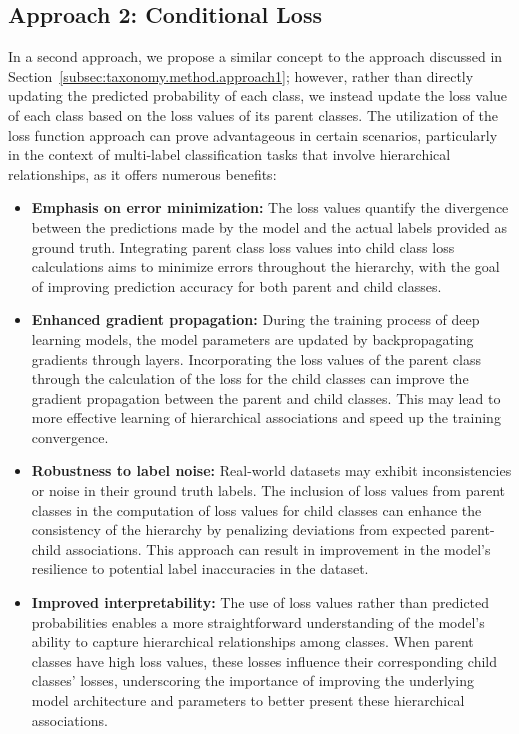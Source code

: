 \documentclass[final,1p,times,authoryear]{elsarticle}
\begin{document}
\subsection{Approach 2: Conditional Loss}\label{subsec:taxonomy.method.approach2}
In a second approach, we propose a similar concept to the approach discussed in Section~\ref{subsec:taxonomy.method.approach1}; however, rather than directly updating the predicted probability of each class, we instead update the loss value of each class based on the loss values of its parent classes. The utilization of the loss function approach can prove advantageous in certain scenarios, particularly in the context of multi-label classification tasks that involve hierarchical relationships, as it offers numerous benefits:
\begin{itemize}
    \item \textbf{Emphasis on error minimization:} The loss values quantify the divergence between the predictions made by the model and the actual labels provided as ground truth. Integrating parent class loss values into child class loss calculations aims to minimize errors throughout the hierarchy, with the goal of improving prediction accuracy for both parent and child classes.
    \item \textbf{Enhanced gradient propagation:} During the training process of deep learning models, the model parameters are updated by backpropagating gradients through layers. Incorporating the loss values of the parent class through the calculation of the loss for the child classes can improve the gradient propagation between the parent and child classes. This may lead to more effective learning of hierarchical associations and speed up the training convergence.
    \item \textbf{Robustness to label noise:} Real-world datasets may exhibit inconsistencies or noise in their ground truth labels. The inclusion of loss values from parent classes in the computation of loss values for child classes can enhance the consistency of the hierarchy by penalizing deviations from expected parent-child associations. This approach can result in improvement in the model's resilience to potential label inaccuracies in the dataset.
    \item \textbf{Improved interpretability:} The use of loss values rather than predicted probabilities enables a more straightforward understanding of the model's ability to capture hierarchical relationships among classes. When parent classes have high loss values, these losses influence their corresponding child classes' losses, underscoring the importance of improving the underlying model architecture and parameters to better present these hierarchical associations.
\end{itemize}
\end{document}
